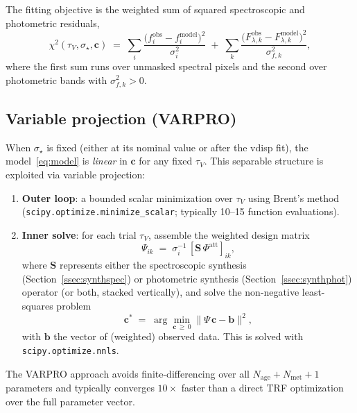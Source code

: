 \documentclass[12pt]{article}
\newcommand{\tauv}{\tau_{V}}
\newcommand{\vdisp}{\sigma_{\star}}
\newcommand{\cc}{\mathbf{c}}
\begin{document}
The fitting objective is the weighted sum of squared spectroscopic and
photometric residuals,
\begin{equation}
  \chi^2(\tauv,\vdisp,\cc)
  \;=\;
  \sum_i \frac{\bigl(f_i^{\mathrm{obs}} - f_i^{\mathrm{model}}\bigr)^2}
              {\sigma_i^2}
  \;+\;
  \sum_k \frac{\bigl(F_{\lambda,k}^{\mathrm{obs}} - F_{\lambda,k}^{\mathrm{model}}\bigr)^2}
              {\sigma_{\!f,k}^2},
  \label{eq:chi2}
\end{equation}
where the first sum runs over unmasked spectral pixels and the second over
photometric bands with $\sigma_{\!f,k}^2 > 0$.

\subsection{Variable projection (VARPRO)}
\label{ssec:varpro}

When $\vdisp$ is fixed (either at its nominal value or after the vdisp fit),
the model~\eqref{eq:model} is \emph{linear} in $\cc$ for any fixed $\tauv$.
This separable structure is exploited via variable projection:

\begin{enumerate}
  \item \textbf{Outer loop}: a bounded scalar minimization over $\tauv$ using
    Brent's method (\texttt{scipy.optimize.minimize\_scalar}; typically
    10--15 function evaluations).
  \item \textbf{Inner solve}: for each trial $\tauv$, assemble the weighted
    design matrix
    \begin{equation}
      \Psi_{ik} \;=\; \sigma_i^{-1}\,[\mathbf{S}\,\Phi^{\mathrm{att}}]_{ik},
      \label{eq:Psi}
    \end{equation}
    where $\mathbf{S}$ represents either the spectroscopic synthesis
    (Section~\ref{ssec:synthspec}) or photometric synthesis
    (Section~\ref{ssec:synthphot}) operator (or both, stacked vertically),
    and solve the non-negative least-squares problem
    \begin{equation}
      \boxed{
      \cc^* \;=\; \arg\min_{\cc\,\geq\,0}
                  \|\Psi\,\cc - \mathbf{b}\|^2,
      }
      \label{eq:nnls}
    \end{equation}
    with $\mathbf{b}$ the vector of (weighted) observed data.
    This is solved with \texttt{scipy.optimize.nnls}.
\end{enumerate}

The VARPRO approach avoids finite-differencing over all $N_{\mathrm{age}}
+ N_{\mathrm{met}} + 1$ parameters and typically converges $10\times$ faster
than a direct TRF optimization over the full parameter vector.
\end{document}
